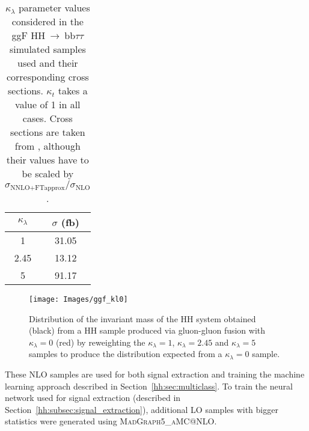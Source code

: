 \documentclass[../main.tex]{subfiles}
\begin{document}
\begin{table}[h!]
\begin{center}
\begin{tabular}{c | c}
$\kappa_\lambda$ & $\sigma$ (fb) \\ \hline
1    & 31.05 \\
2.45 & 13.12 \\
5    & 91.17
\end{tabular}
\caption{$\kappa_\lambda$ parameter values considered in the ggF HH$~\to~$bb$\tau\tau$ simulated samples used and their corresponding cross sections. $\kappa_t$ takes a value of 1 in all cases. Cross sections are taken from \cite{hh:analysis:xs}, although their values have to be scaled by $\sigma_{\text{NNLO+FTapprox}}/\sigma_\text{NLO}$.}
\label{hh:analysis:ggf_samples}
\end{center}
\end{table}

\begin{figure}[h!]
\begin{center}
\texttt{[image: Images/ggf\_kl0]}
\end{center}
\caption{Distribution of the invariant mass of the HH system obtained (black) from a HH sample produced via gluon-gluon fusion with $\kappa_\lambda=0$ (red) by reweighting the $\kappa_\lambda=1$, $\kappa_\lambda=2.45$ and $\kappa_\lambda=5$ samples to produce the distribution expected from a $\kappa_\lambda=0$ sample.}
\label{hh:fig:ggf_rew_test}
\end{figure}

These NLO samples are used for both signal extraction and training the machine learning approach described in Section~\ref{hh:sec:multiclass}. To train the neural network used for signal extraction (described in Section~\ref{hh:subsec:signal_extraction}), additional LO samples with bigger statistics were generated using \textsc{MadGraph5\_aMC@NLO}.
\end{document}
